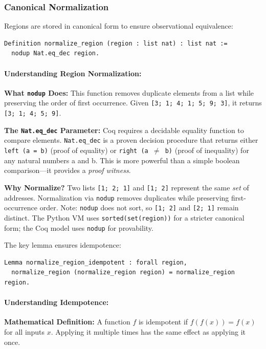 \subsubsection{Canonical Normalization}

Regions are stored in canonical form to ensure observational equivalence:
\begin{lstlisting}
Definition normalize_region (region : list nat) : list nat :=
  nodup Nat.eq_dec region.
\end{lstlisting}

\paragraph{Understanding Region Normalization:}
\textbf{What \texttt{nodup} Does:} This function removes duplicate elements from a list while preserving the order of first occurrence. Given \texttt{[3; 1; 4; 1; 5; 9; 3]}, it returns \texttt{[3; 1; 4; 5; 9]}.

\textbf{The \texttt{Nat.eq\_dec} Parameter:} Coq requires a decidable equality function to compare elements. \texttt{Nat.eq\_dec} is a proven decision procedure that returns either \texttt{left (a = b)} (proof of equality) or \texttt{right (a $\neq$ b)} (proof of inequality) for any natural numbers a and b. This is more powerful than a simple boolean comparison—it provides a \emph{proof witness}.

\textbf{Why Normalize?} Two lists \texttt{[1; 2; 1]} and \texttt{[1; 2]} represent the same \emph{set} of addresses. Normalization via \texttt{nodup} removes duplicates while preserving first-occurrence order. Note: \texttt{nodup} does not sort, so \texttt{[1; 2]} and \texttt{[2; 1]} remain distinct. The Python VM uses \texttt{sorted(set(region))} for a stricter canonical form; the Coq model uses \texttt{nodup} for provability.

The key lemma ensures idempotence:
\begin{lstlisting}
Lemma normalize_region_idempotent : forall region,
  normalize_region (normalize_region region) = normalize_region region.
\end{lstlisting}

\paragraph{Understanding Idempotence:}
\textbf{Mathematical Definition:} A function $f$ is idempotent if $f(f(x)) = f(x)$ for all inputs $x$. Applying it multiple times has the same effect as applying it once.

